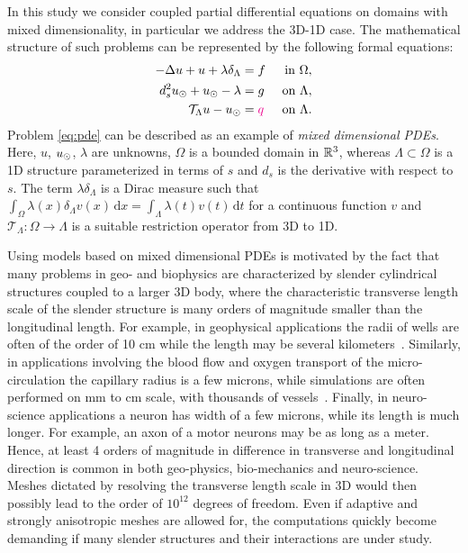 \documentclass[r]{siamart171218}
\newcommand{\paolo}[1]{{\color{magenta}#1}}
\begin{document}
In this study we consider coupled partial differential equations on domains with mixed dimensionality, in particular we address the  3D-1D case. The mathematical structure of such problems can be represented by the following formal equations:
\begin{subequations}
\label{eq:pde}
\begin{align}
\label{eq:pde1}
  -\Delta u + u + \lambda \delta_{\Lambda} &= f &\mbox{ in } \Omega,\\
\label{eq:pde2}
 d_s^2 \ud + \ud - \lambda &= g &\mbox{ on } \Lambda,\\
\label{eq:coupling}
\mathcal{T}_\Lambda u - \ud  &=  \paolo{q} &\mbox{ on } \Lambda . 
\end{align}
\end{subequations}
Problem \eqref{eq:pde} can be described as an example of \emph{mixed dimensional PDEs}.
Here, $u$, $u_{\odot}$,  $\lambda$ are unknowns,  $\Omega$ is a bounded domain in $\mathbb{R}^3$, whereas $\Lambda \subset \Omega$ is a 1D structure
parameterized in terms of $s$ and $d_s$ is the derivative with respect to $s$. 
The term $\lambda\delta_{\Lambda}$ is a Dirac measure such that 
$\int_{\Omega}\lambda(x)\delta_{\Lambda}v(x)\,\mathrm{d}x=\int_{\Lambda}\lambda(t)v(t) \,\mathrm{d}t$
for a continuous function $v$ and $\mathcal{T}_\Lambda: \Omega\rightarrow\Lambda$ is a suitable restriction operator from 3D to 1D. 

Using models based on mixed dimensional PDEs is motivated by the fact that many problems in geo- and biophysics are characterized by slender cylindrical structures coupled to a larger 3D body, where the characteristic transverse length scale of the slender structure is many orders of magnitude smaller than the longitudinal length.  For example, in geophysical applications the radii of wells are often of the order of 10 cm while the length may be several kilometers~\cite{Peaceman1978183, Peaceman1983531}. Similarly, in applications involving the blood flow and oxygen transport of the micro-circulation the capillary radius is a few microns, while simulations are often performed on mm to cm scale, with thousands of vessels~\cite{berg2020modelling,fang2008oxygen,gould2017capillary, secomb2004green}. Finally, in neuro-science applications a neuron has width of a few microns, while  its length is much longer. For example, an axon of a motor neurons may be as long as a meter.  Hence,  at least 4 orders of magnitude in difference in transverse and longitudinal direction is common in both geo-physics, bio-mechanics and neuro-science. Meshes dictated by resolving the transverse length scale in 3D would then possibly lead to the order of $10^{12}$ degrees of freedom. Even if adaptive and strongly anisotropic meshes are allowed for, the computations quickly become demanding if many slender structures and their interactions are under study.  
\end{document}
